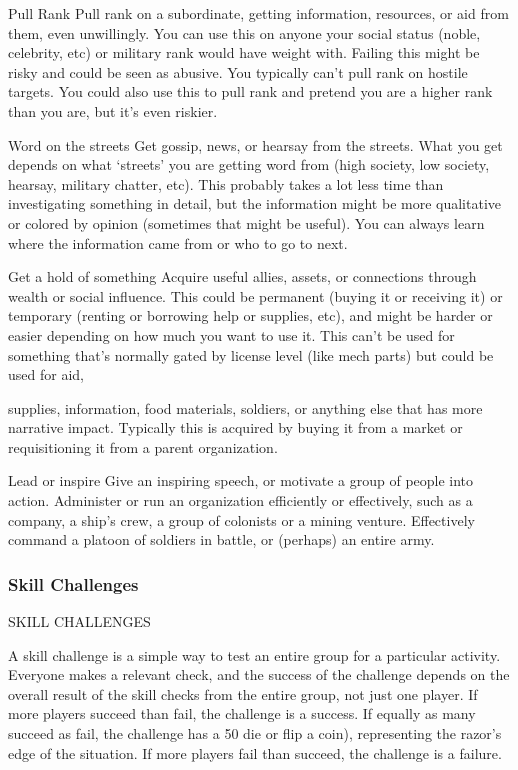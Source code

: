 Pull Rank
Pull rank on a subordinate, getting information, resources, or aid from them, even unwillingly. You
can use this on anyone your social status (noble, celebrity, etc) or military rank would have weight
with. Failing this might be risky and could be seen as abusive. You typically can’t pull rank on
hostile targets. You could also use this to pull rank and pretend you are a higher rank than you
are, but it’s even riskier.

Word on the streets
Get gossip, news, or hearsay from the streets. What you get depends on what ‘streets’ you are
getting word from (high society, low society, hearsay, military chatter, etc). This probably takes a
lot less time than investigating something in detail, but the information might be more qualitative
or colored by opinion (sometimes that might be useful). You can always learn where the
information came from or who to go to next.

Get a hold of something
Acquire useful allies, assets, or connections through wealth or social influence. This could be
permanent (buying it or receiving it) or temporary (renting or borrowing help or supplies, etc), and
might be harder or easier depending on how much you want to use it. This can’t be used for
something that’s normally gated by license level (like mech parts) but could be used for aid,




supplies, information, food materials, soldiers, or anything else that has more narrative impact.
Typically this is acquired by buying it from a market or requisitioning it from a parent organization.

Lead or inspire
Give an inspiring speech, or motivate a group of people into action. Administer or run an
organization efficiently or effectively, such as a company, a ship’s crew, a group of colonists or a
mining venture. Effectively command a platoon of soldiers in battle, or (perhaps) an entire army.

\subsubsection{Skill Challenges}
                                         SKILL CHALLENGES

A skill challenge is a simple way to test an entire group for a particular activity. Everyone makes a
relevant check, and the success of the challenge depends on the overall result of the skill checks
from the entire group, not just one player. If more players succeed than fail, the challenge is a
success. If equally as many succeed as fail, the challenge has a 50%
die or flip a coin), representing the razor’s edge of the situation. If more players fail than succeed,
the challenge is a failure.

